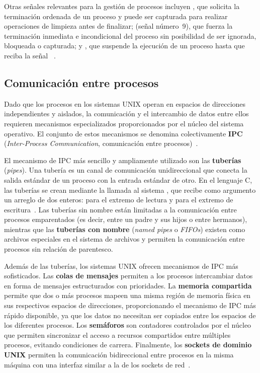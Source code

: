 Otras señales relevantes para la gestión de procesos incluyen , que solicita la terminación ordenada de un proceso y puede ser capturada para realizar operaciones de limpieza antes de finalizar;  (señal número~9), que fuerza la terminación inmediata e incondicional del proceso sin posibilidad de ser ignorada, bloqueada o capturada; y , que suspende la ejecución de un proceso hasta que reciba la señal ~\cite{kerrisk2010}.

\subsection{Comunicación entre procesos}
\label{subsec:ipc}

Dado que los procesos en los sistemas UNIX operan en espacios de direcciones independientes y aislados, la comunicación y el intercambio de datos entre ellos requieren mecanismos especializados proporcionados por el núcleo del sistema operativo. El conjunto de estos mecanismos se denomina colectivamente \textbf{IPC} (\textit{Inter-Process Communication}, comunicación entre procesos)~\cite{stevens2013}.

El mecanismo de IPC más sencillo y ampliamente utilizado son las \textbf{tuberías} (\textit{pipes}). Una tubería es un canal de comunicación unidireccional que conecta la salida estándar de un proceso con la entrada estándar de otro. En el lenguaje C, las tuberías se crean mediante la llamada al sistema , que recibe como argumento un arreglo de dos enteros:  para el extremo de lectura y  para el extremo de escritura~\cite{kerrisk2010}. Las tuberías sin nombre están limitadas a la comunicación entre procesos emparentados (es decir, entre un padre y sus hijos o entre hermanos), mientras que las \textbf{tuberías con nombre} (\textit{named pipes} o \textit{FIFOs}) existen como archivos especiales en el sistema de archivos y permiten la comunicación entre procesos sin relación de parentesco.

Además de las tuberías, los sistemas UNIX ofrecen mecanismos de IPC más sofisticados. Las \textbf{colas de mensajes} permiten a los procesos intercambiar datos en forma de mensajes estructurados con prioridades. La \textbf{memoria compartida} permite que dos o más procesos mapeen una misma región de memoria física en sus respectivos espacios de direcciones, proporcionando el mecanismo de IPC más rápido disponible, ya que los datos no necesitan ser copiados entre los espacios de los diferentes procesos. Los \textbf{semáforos} son contadores controlados por el núcleo que permiten sincronizar el acceso a recursos compartidos entre múltiples procesos, evitando condiciones de carrera. Finalmente, los \textbf{sockets de dominio UNIX} permiten la comunicación bidireccional entre procesos en la misma máquina con una interfaz similar a la de los sockets de red~\cite{stevens2013, kerrisk2010}.

